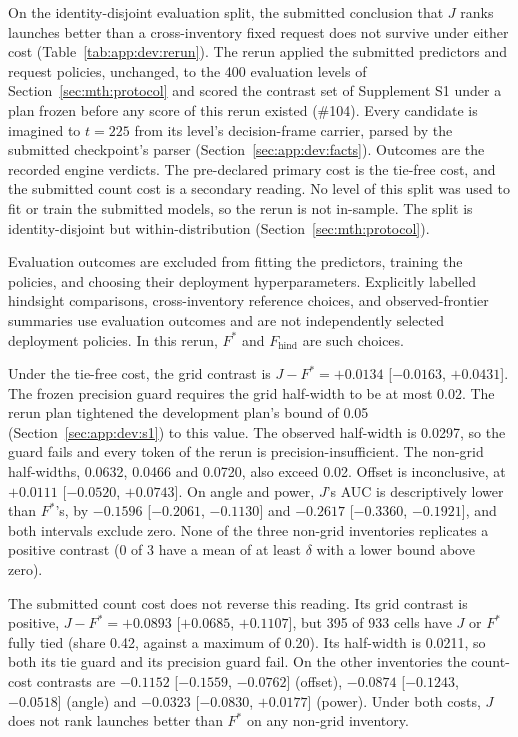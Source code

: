 \begin{revblock}
On the identity-disjoint evaluation split, the submitted conclusion that $J$ ranks launches better than a cross-inventory fixed request does not survive under either cost (Table~\ref{tab:app:dev:rerun}). The rerun applied the submitted predictors and request policies, unchanged, to the 400 evaluation levels of Section~\ref{sec:mth:protocol} and scored the contrast set of Supplement S1 under a plan frozen before any score of this rerun existed (\#104). Every candidate is imagined to $t=225$ from its level's decision-frame carrier, parsed by the submitted checkpoint's parser (Section~\ref{sec:app:dev:facts}). Outcomes are the recorded engine verdicts. The pre-declared primary cost is the tie-free cost, and the submitted count cost is a secondary reading. No level of this split was used to fit or train the submitted models, so the rerun is not in-sample. The split is identity-disjoint but within-distribution (Section~\ref{sec:mth:protocol}).

Evaluation outcomes are excluded from fitting the predictors, training the policies, and choosing their deployment hyperparameters. Explicitly labelled hindsight comparisons, cross-inventory reference choices, and observed-frontier summaries use evaluation outcomes and are not independently selected deployment policies. In this rerun, $F^{*}$ and $F_{\mathrm{hind}}$ are such choices.

Under the tie-free cost, the grid contrast is $J-F^{*}=+0.0134$ [$-0.0163$, $+0.0431$]. The frozen precision guard requires the grid half-width to be at most 0.02. The rerun plan tightened the development plan's bound of 0.05 (Section~\ref{sec:app:dev:s1}) to this value. The observed half-width is 0.0297, so the guard fails and every token of the rerun is precision-insufficient. The non-grid half-widths, 0.0632, 0.0466 and 0.0720, also exceed 0.02. Offset is inconclusive, at $+0.0111$ [$-0.0520$, $+0.0743$]. On angle and power, $J$'s AUC is descriptively lower than $F^{*}$'s, by $-0.1596$ [$-0.2061$, $-0.1130$] and $-0.2617$ [$-0.3360$, $-0.1921$], and both intervals exclude zero. None of the three non-grid inventories replicates a positive contrast (0 of 3 have a mean of at least $\delta$ with a lower bound above zero).

The submitted count cost does not reverse this reading. Its grid contrast is positive, $J-F^{*}=+0.0893$ [$+0.0685$, $+0.1107$], but 395 of 933 cells have $J$ or $F^{*}$ fully tied (share 0.42, against a maximum of 0.20). Its half-width is 0.0211, so both its tie guard and its precision guard fail. On the other inventories the count-cost contrasts are $-0.1152$ [$-0.1559$, $-0.0762$] (offset), $-0.0874$ [$-0.1243$, $-0.0518$] (angle) and $-0.0323$ [$-0.0830$, $+0.0177$] (power). Under both costs, $J$ does not rank launches better than $F^{*}$ on any non-grid inventory.


\end{revblock}
